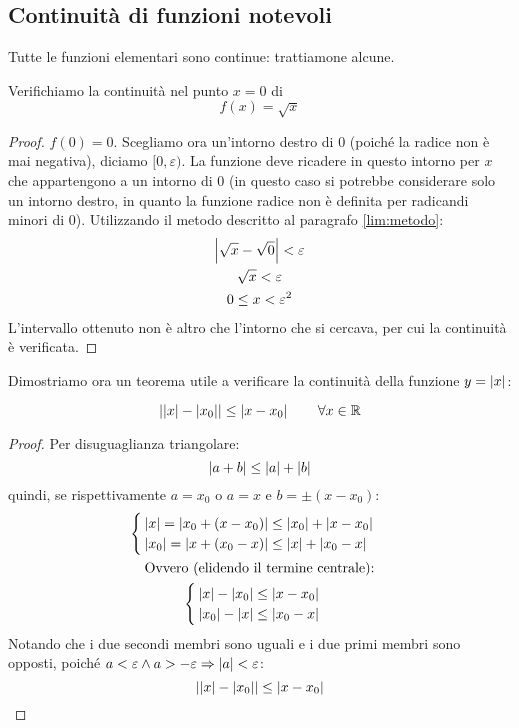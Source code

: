 \subsection{Continuità di funzioni notevoli}
Tutte le funzioni elementari sono continue: trattiamone alcune.
\begin{examp}
	Verifichiamo la continuità nel punto $x=0$ di
	\[
		f(x)=\sqrt{x}
	\]
\end{examp}
\begin{proof}
	$f(0)=0$. Scegliamo ora un'intorno destro di $0$ (poiché la radice non è mai negativa), diciamo $[0,\varepsilon)$. La funzione deve ricadere in questo intorno per $x$ che appartengono a un intorno di $0$ (in questo caso si potrebbe considerare solo un intorno destro, in quanto la funzione radice non è definita per radicandi minori di $0$). Utilizzando il metodo descritto al paragrafo \ref{lim:metodo}:
	\begin{gather*}
		\left\lvert \sqrt{x}-\sqrt{0} \right\rvert<\varepsilon\\
		\sqrt{x}<\varepsilon\\
		0\leq x<\varepsilon^2
	\end{gather*}
	L'intervallo ottenuto non è altro che l'intorno che si cercava, per cui la continuità è verificata.
\end{proof}

Dimostriamo ora un teorema utile a verificare la continuità della funzione $y=\left\lvert x \right\rvert$:
\begin{teor}
	\label{disug:contrario}
	\[
		\left\lvert \left\lvert x \right\rvert-\left\lvert x_0 \right\rvert \right\rvert\leq\left\lvert x-x_0 \right\rvert\qquad\forall x\in\mathbb{R}
	\]
\end{teor}
\begin{proof}
	Per disuguaglianza triangolare:
	\[
		\left\lvert a+b \right\rvert\leq\left\lvert a \right\rvert+\left\lvert b \right\rvert
	\]
	quindi, se rispettivamente $a=x_0$ o $a=x$ e $b=\pm(x-x_0)$:
	\begin{gather*}
		\begin{cases}
			\left\lvert x \right\rvert=\left\lvert x_0+(x-x_0) \right\rvert\leq\left\lvert x_0 \right\rvert+\left\lvert x-x_0 \right\rvert \\
			\left\lvert x_0 \right\rvert=\left\lvert x+(x_0-x) \right\rvert\leq\left\lvert x \right\rvert+\left\lvert x_0-x \right\rvert
		\end{cases}\\
		\text{Ovvero (elidendo il termine centrale):}\\
		\begin{cases}
			\left\lvert x \right\rvert-\left\lvert x_0 \right\rvert\leq\left\lvert x-x_0 \right\rvert \\
			\left\lvert x_0 \right\rvert-\left\lvert x \right\rvert\leq\left\lvert x_0-x \right\rvert \\
		\end{cases}
	\end{gather*}
	Notando che i due secondi membri sono uguali e i due primi membri sono opposti, poiché $a<\varepsilon\land a>-\varepsilon\Rightarrow\left\lvert a \right\rvert<\varepsilon$:
	\[
		\left\lvert \left\lvert x \right\rvert-\left\lvert x_0 \right\rvert \right\rvert\leq\left\lvert x-x_0 \right\rvert
	\]
\end{proof}

